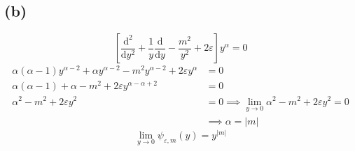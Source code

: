 \documentclass[letter, 10pts]{article}
\begin{document}
\subsection*{(b)} 
\[
\left[
\frac{\mathrm{d} ^2}{\mathrm{d} y^2}
+ 
\frac{1}{y} \frac{\mathrm{d} }{\mathrm{d} y}
- 
\frac{m^2}{y^2}
+ 
2 \varepsilon 
\right]
y^{\alpha}
= 0
\] 
\begin{align*}
\alpha (\alpha - 1) y^{\alpha - 2} + 
\alpha y^{\alpha - 2} - 
m^2 y^{\alpha - 2} + 
2 \varepsilon y^{\alpha} &= 0 
\\
\alpha (\alpha - 1) + 
\alpha  - 
m^2  + 
2 \varepsilon y^{\alpha - \alpha + 2} &= 0 
\\
\alpha^2 
- 
m^2  + 
2 \varepsilon y^{2} &= 0 
\implies
\lim_{y \to 0} \alpha^2 - m^2 + 2 \varepsilon y^2 = 0
\\
		    &\implies \alpha = |m|
\end{align*}
\[
\boxed{
	\lim_{y \to 0} \psi_{\varepsilon, m}(y) = y^{|m|}
}
\] 
\end{document}
